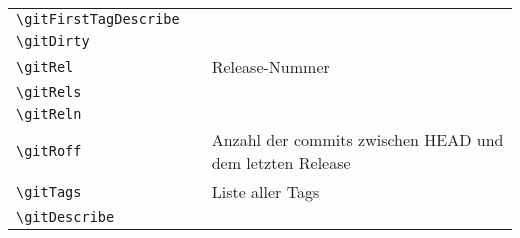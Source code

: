 \begin{table}
\begin{tabularx}{\textwidth}{lFF}
		\verb_\gitFirstTagDescribe_ &
			\gitFirstTagDescribe &
			\\
		\verb_\gitDirty_ &
			\gitDirty &
			\\
		\verb_\gitRel_ &
			\gitRel &
			Release-Nummer \\
		\verb_\gitRels_ &
			\gitRels &
			\\
		\verb_\gitReln_ &
			\gitReln &
			\\
		\verb_\gitRoff_ &
			\gitRoff &
			Anzahl der commits zwischen HEAD und dem letzten Release \\
		\verb_\gitTags_ &
			\gitTags &
			Liste aller Tags \\
		\verb_\gitDescribe_ &
			\gitDescribe &
			\\ \hline
	\end{tabularx}
\end{table}
\FloatBarrier



